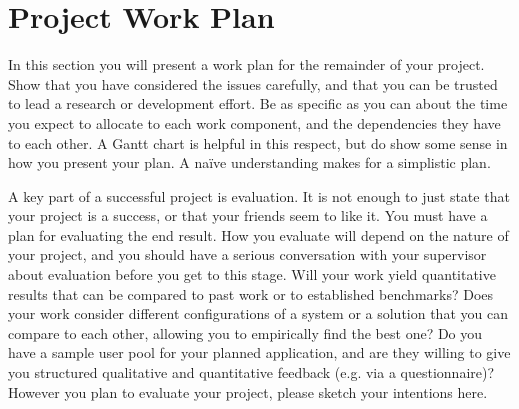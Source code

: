 \chapter{Project Work Plan}

In this section you will present a work plan for the remainder of your project. Show that you have considered the issues carefully, and that you can be trusted to lead a research or development effort. Be as specific as you can about the time you expect to allocate to each work component, and the dependencies they have to each other. A Gantt chart is helpful in this respect, but do show some sense in how you present your plan. A naïve understanding makes for a simplistic plan.

A key part of a successful project is evaluation. It is not enough to just state that your project is a success, or that your friends seem to like it. You must have a plan for evaluating the end result. How you evaluate will depend on the nature of your project, and you should have a serious conversation with your supervisor about evaluation before you get to this stage. Will your work yield quantitative results that can be compared to past work or to established benchmarks? Does your work consider different configurations of a system or a solution that you can compare to each other, allowing you to empirically find the best one? Do you have a sample user pool for your planned application, and are they willing to give you structured qualitative and quantitative feedback (e.g. via a questionnaire)? However you plan to evaluate your project, please sketch your intentions here.
